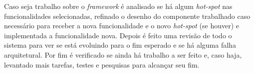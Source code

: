 Caso seja trabalho sobre o \textit{framework} é analisado se há algum \textit{hot-spot} nas funcionalidades selecionadas, refinado o desenho do componente trabalhado caso necessário para receber a nova funcionalidade e o novo \textit{hot-spot} (se houver) e implementada a funcionalidade nova. Depois é feito uma revisão de todo o sistema para ver se está evoluindo para o fim esperado e se há alguma falha arquitetural. Por fim é verificado se ainda há trabalho a ser feito e, caso haja, levantado mais tarefas, testes e pesquisas para alcançar seu fim.
